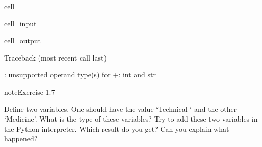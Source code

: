 \documentclass[letterpaper,10pt,english]{jupyterBook}
\begin{document}
\begin{sphinxuseclass}{cell}\begin{sphinxVerbatimInput}

\begin{sphinxuseclass}{cell_input}
\begin{sphinxVerbatim}[commandchars=\\\{\}]
  
\end{sphinxVerbatim}

\end{sphinxuseclass}\end{sphinxVerbatimInput}
\begin{sphinxVerbatimOutput}

\begin{sphinxuseclass}{cell_output}
\begin{sphinxVerbatim}[commandchars=\\\{\}]
Traceback (most recent call last)
  
   

: unsupported operand type(s) for +: \PYGZsq{}int\PYGZsq{} and \PYGZsq{}str\PYGZsq{}
\end{sphinxVerbatim}

\end{sphinxuseclass}\end{sphinxVerbatimOutput}

\end{sphinxuseclass}
\begin{sphinxadmonition}{note}{Exercise 1.7}

\sphinxAtStartPar
Define two variables. One should have the value ‘Technical ‘ and the other ‘Medicine’. What is the type of these variables? Try to add these two variables in the Python interpreter. Which result do you get? Can you explain what happened?
\end{sphinxadmonition}
\end{document}

